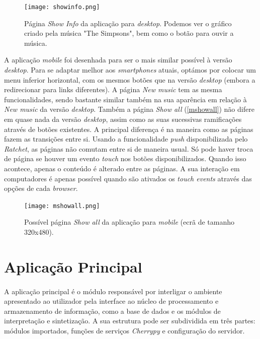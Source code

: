 \documentclass[11pt,openany,twoside]{report}
\begin{document}
\begin{figure}
 \center
 \texttt{[image: showinfo.png]}
 \caption{Página \textit{Show Info} da aplicação para \textit{desktop}. Podemos ver o gráfico criado pela música "The Simpsons", bem como o botão para ouvir a música.}
 \label{showinfo}
\end{figure}

A aplicação \textit{mobile} foi desenhada para ser o mais similar possível à versão \textit{desktop}. Para se adaptar melhor aos \textit{smartphones} atuais, optámos por colocar um menu inferior horizontal, com os mesmos botões que na versão \textit{desktop} (embora a redirecionar para links diferentes). A página \textit{New music} tem as mesma funcionalidades, sendo bastante similar também na sua aparência em relação à \textit{New music} da versão \textit{desktop}. Também a página \textit{Show all} (\autoref{mshowall}) não difere em quase nada da versão \textit{desktop}, assim como as suas sucessivas ramificações através de botões existentes. A principal diferença é na maneira como as páginas fazem as transições entre si.
Usando a funcionalidade \textit{push} disponibilizada pelo \textit{Ratchet}, as páginas não comutam entre si de maneira usual. Só pode haver troca de página se houver um evento \textit{touch} nos botões disponibilizados. Quando isso acontece, apenas o conteúdo é alterado entre as páginas. A sua interação em computadores é apenas possível quando são ativados os \textit{touch events} através das opções de cada \textit{browser}.

\begin{figure}
 \center
 \texttt{[image: mshowall.png]}
 \caption{Possível página \textit{Show all} da aplicação para \textit{mobile} (ecrã de tamanho 320x480).}
 \label{mshowall}
\end{figure}

\section{Aplicação Principal}
\paragraph{ } A aplicação principal é o módulo responsável por interligar o ambiente apresentado ao utilizador pela interface ao núcleo de processamento e armazenamento de informação, como a base de dados e os módulos de interpretação e sintetização. A sua estrutura pode ser subdividida em três partes: módulos importados, funções de serviços \textit{Cherrypy} e configuração do servidor.
\end{document}
